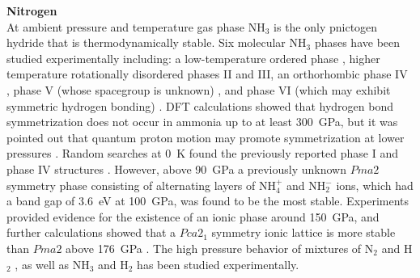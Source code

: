 \documentclass[12pt,letterpaper,oneside]{article}
\begin{document}
\noindent\textbf{Nitrogen} \\ 
% 
At ambient pressure and temperature gas phase NH$_3$ is the only pnictogen hydride that is thermodynamically stable. Six molecular NH$_3$ phases have been studied experimentally including: a low-temperature ordered phase \cite{Hewat:1979}, higher temperature rotationally disordered phases II and III, an orthorhombic phase IV \cite{Loveday:1996,Datchi:2006}, phase V (whose spacegroup is unknown) \cite{Gauthier:1988a}, and phase VI (which may exhibit symmetric hydrogen bonding) \cite{Datchi:2006}. DFT calculations showed that hydrogen bond symmetrization does not occur in ammonia up to at least 300~GPa, but it was pointed out that quantum proton motion may promote symmetrization at lower pressures \cite{Fortes:2003a}. Random searches at 0~K found the previously reported phase I and phase IV structures \cite{Pickard:2008a}. However, above 90~GPa a previously unknown $Pma2$ symmetry phase consisting of alternating layers of NH$_4^+$ and NH$_2^-$ ions, which had a band gap of 3.6~eV at 100~GPa, was found to be the most stable. Experiments provided evidence for the existence of an ionic phase around 150~GPa, and further calculations showed that a $Pca2_1$ symmetry ionic lattice is more stable than $Pma2$ above 176~GPa \cite{Ninet:2014}. The high pressure behavior of mixtures of N$_2$ and H$_2$ \cite{Spaulding:2014a,Goncharov:2015a}, as well as NH$_3$ and H$_2$ \cite{Chidester:2011a} has been studied experimentally. \\
\end{document}
